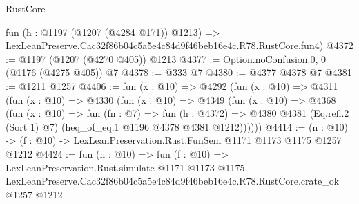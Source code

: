 \begin{lexlean}{RustCore}
\begin{coremodule}
    fun (h : @1197 (@1207 (@4284 @171)) @1213) =>
    LexLeanPreserve.Cac32f86b04c5a5e4c84d9f46beb16e4c.R78.RustCore.fun4)
@4372 := @1197 (@1207 (@4270 @405)) @1213
@4377 := Option.noConfusion.{0, 0} (@1176 (@4275 @405)) @7
@4378 := @333 @7
@4380 := @4377 @4378 @7
@4381 := @1211 @1257
@4406 := fun (x : @10) =>
  @4292
    (fun (x : @10) =>
    @4311
      (fun (x : @10) =>
      @4330
        (fun (x : @10) =>
        @4349
          (fun (x : @10) =>
          @4368
            (fun (x : @10) =>
            fun (fn : @7) =>
            fun (h : @4372) =>
            @4380 @4381 (Eq.refl.{2} (Sort 1) @7) (heq_of_eq.{1} @1196 @4378 @4381 @1212))))))
@4414 := (n : @10) -> (f : @10) -> LexLeanPreservation.Rust.FunSem @1171 @1173 @1175 @1257 @1212
@4424 := fun (n : @10) =>
  fun (f : @10) =>
  LexLeanPreservation.Rust.simulate
    @1171
    @1173
    @1175
    LexLeanPreserve.Cac32f86b04c5a5e4c84d9f46beb16e4c.R78.RustCore.crate_ok
    @1257
    @1212
\end{coremodule}
\end{lexlean}
